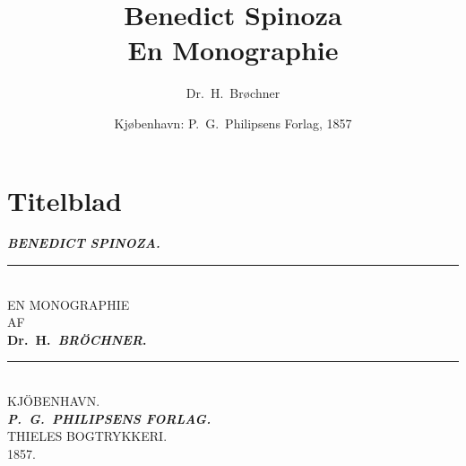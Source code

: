\documentclass[12pt,a4paper]{book}
\title{\textbf{Benedict Spinoza}\\[10pt]
  \large En Monographie}
\author{Dr.\ H.\ Brøchner}
\date{Kjøbenhavn: P.\ G.\ Philipsens Forlag, 1857}
\begin{document}
\maketitle
\thispagestyle{empty}
\newpage

\chapter*{Titelblad}

\begin{center}
{\Large\textbf{\emph{BENEDICT SPINOZA.}}}\\[8pt]
\rule{2cm}{0.4pt}\\[8pt]
{\large EN MONOGRAPHIE}\\[6pt]
AF\\[6pt]
\textbf{Dr.\ H.\ \emph{BRÖCHNER}.}\\[10pt]
\rule{1.5cm}{0.4pt}\\[10pt]
KJÖBENHAVN.\\[4pt]
\textbf{\emph{P.\ G.\ PHILIPSENS FORLAG.}}\\[4pt]
{\small THIELES BOGTRYKKERI.}\\[4pt]
1857.
\end{center}

\newpage
\end{document}
